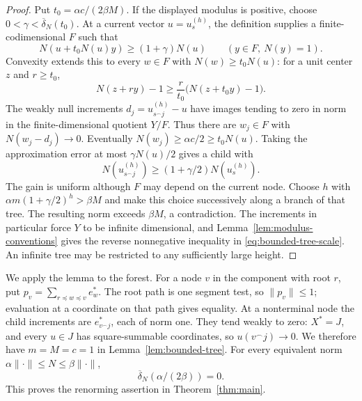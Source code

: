 \begin{proof}
Put $t_0=\alpha c/(2\beta M)$. If the displayed modulus is positive,
choose $0<\gamma<\overline\delta_N(t_0)$. At a current vector
$u=u_s^{(h)}$, the definition supplies a finite-codimensional $F$ such that
\[
 N(u+t_0N(u)y)\ge(1+\gamma)N(u)
 \qquad(y\in F,\ N(y)=1).
\]
Convexity extends this to every $w\in F$ with $N(w)\ge t_0N(u)$:
for a unit center $z$ and $r\ge t_0$,
\[
 N(z+ry)-1\ge\frac r{t_0}\bigl(N(z+t_0y)-1\bigr).
\]
The weakly null increments $d_j=u_{s^\frown j}^{(h)}-u$ have images
tending to zero in norm in the finite-dimensional quotient $Y/F$.
Thus there are $w_j\in F$ with $N(w_j-d_j)\to0$. Eventually
$N(w_j)\ge\alpha c/2\ge t_0N(u)$. Taking the approximation error
at most $\gamma N(u)/2$ gives a child with
\[
 N(u_{s^\frown j}^{(h)})\ge(1+\gamma/2)N(u_s^{(h)}).
\]
The gain is uniform although $F$ may depend on the current node.
Choose $h$ with $\alpha m(1+\gamma/2)^h>\beta M$ and make this
choice successively along a branch of that tree. The resulting norm
exceeds $\beta M$, a contradiction. The increments in particular
force $Y$ to be infinite dimensional, and Lemma~\ref{lem:modulus-conventions}
gives the reverse nonnegative inequality in \eqref{eq:bounded-tree-scale}.
An infinite tree may be restricted to any sufficiently large height.
\end{proof}

We apply the lemma to the forest. For a node $v$ in the component with
root $r$, put $p_v=\sum_{r\preceq w\preceq v}e_w^*$. The root path
is one segment test, so $\|p_v\|\le1$; evaluation at a coordinate
on that path gives equality. At a nonterminal node the child increments
are $e_{v^\frown j}^*$, each of norm one. They tend weakly to zero:
$X^*=J$, and every $u\in J$ has square-summable coordinates, so
$u(v^\frown j)\to0$. We therefore have $m=M=c=1$ in
Lemma~\ref{lem:bounded-tree}. For every equivalent norm
$\alpha\|\cdot\|\le N\le\beta\|\cdot\|$,
\[
 \overline\delta_N(\alpha/(2\beta))=0.
\]
This proves the renorming assertion in Theorem~\ref{thm:main}.
